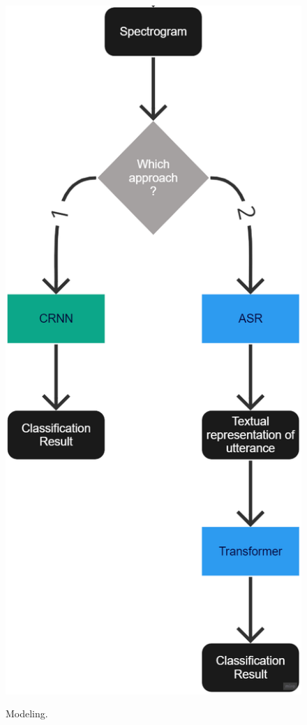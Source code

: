 \begin{enumerate}
\begin{figure}[h!]
\centering
\includegraphics[scale=0.5]{images/SER_Modeling.png}\\
\caption{Modeling.}\label{fig:ser_modeling}
\end{figure}




\end{enumerate}
